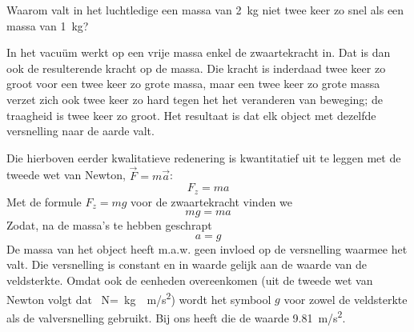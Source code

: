 \item Waarom valt in het luchtledige een massa van \SI{2}{kg} niet twee keer zo snel als een massa van \SI{1}{kg}?

\begin{oplossing}
In het vacu\"um werkt op een vrije massa enkel de zwaartekracht in. Dat is dan ook de resulterende kracht op de massa. Die kracht is inderdaad twee keer zo groot voor een twee keer zo grote massa, maar een twee keer zo grote massa verzet zich ook twee keer zo hard tegen het het veranderen van beweging; de traagheid is twee keer zo groot. Het resultaat is dat elk object met dezelfde versnelling naar de aarde valt.

Die hierboven eerder kwalitatieve redenering is kwantitatief uit te leggen met de tweede wet van Newton, $\vec{F}=m\vec{a}$:
\begin{equation*}
F_z=ma%
\end{equation*}
Met de formule $F_z=mg$ voor de zwaartekracht vinden we
\begin{equation*}
mg=ma%
\end{equation*}
Zodat, na de massa's te hebben geschrapt
\begin{equation*}
a=g%
\end{equation*}
De massa van het object heeft m.a.w. geen invloed op de versnelling waarmee het valt. Die versnelling is constant en in waarde gelijk aan de waarde van de veldsterkte. Omdat ook de eenheden overeenkomen (uit de tweede wet van Newton volgt dat \SI{}{N}=\SI{}{kg\cdot m/s^2}) wordt het symbool $g$ voor zowel de veldsterkte als de valversnelling gebruikt. Bij ons heeft die de waarde \SI{9,81}{m/s^2}.
\end{oplossing}